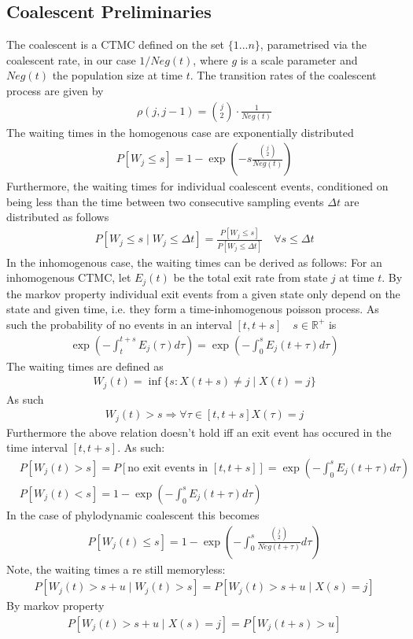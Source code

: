 \documentclass{article}
\newcommand{\R}{\mathbb{R}}
\theoremstyle{definition}
\begin{document}
\subsection{Coalescent Preliminaries}
The coalescent is a CTMC defined on the set $\{1 ... n\}$, parametrised via the coalescent rate, in our case $1/Neg(t)$, where $g$ is a scale parameter and $Neg(t)$ the population size at time $t$. 
The transition rates of the coalescent process are given by 
\begin{gather*}
\rho(j, j-1) = \binom{j}{2}\cdot\frac{1}{Neg(t)}
\end{gather*}
The waiting times in the homogenous case are exponentially distributed
\begin{gather*}
P[W_j \leq s] = 1-\exp(-s\frac{\binom{j}{2}}{Neg(t)})
\end{gather*}
Furthermore, the waiting times for individual coalescent events, conditioned on being less than the time between two consecutive sampling events $\Delta t$ are distributed as follows
\begin{gather}\label{eq:conditional}
P[W_j \leq s\mid W_j \leq \Delta t ] = \frac{P[W_j \leq s]}{P[W_j \leq \Delta t]} \quad\forall s \leq \Delta t
\end{gather}
In the inhomogenous case, the waiting times can be derived as follows:
For an inhomogenous CTMC, let $E_j(t)$ be the total exit rate from state $j$ at time $t$.
By the markov property individual exit events from a given state only depend on the state and given time, i.e. they form a time-inhomogenous poisson process.
As such the probability of no events in an interval $[t,t+s]\quad s\in \R^+$ is 
\begin{gather}
\exp(-\int_t^{t+s}E_j(\tau)d\tau) = \exp(-\int_0^{s}E_j(t+\tau)d\tau)
\end{gather}
The waiting times are defined as
\begin{gather}
W_j(t) = \inf\{s:X(t+s)\neq j \mid X(t) = j\}
\end{gather}
As such
\begin{gather}
W_j(t) > s \Rightarrow \forall \tau\in[t, t+s] X(\tau) = j
\end{gather}
Furthermore the above relation doesn't hold iff an exit event has occured in the time interval $[t,t+s]$. As such:
\begin{align*}
&P[W_j(t) > s] = P[\text{no exit events in }[t,t+s]] = \exp(-\int_0^{s}E_j(t+\tau)d\tau)\\
&P[W_j(t) < s] = 1 - \exp(-\int_0^{s}E_j(t+\tau)d\tau)
\end{align*}
In the case of phylodynamic coalescent this becomes
\begin{gather}
P[W_j(t) \leq s] = 1 - \exp(-\int_0^{s}\frac{\binom{j}{2}}{Neg(t+\tau)}d\tau)
\end{gather}
\newpage
Note, the waiting times a
re still memoryless:
\begin{gather}
P\left[W_j(t) > s+u\mid W_j(t)>s \right] = P\left[W_j(t) > s+u\mid X(s)=j\right]
\end{gather}
By markov property
\begin{gather}
P\left[W_j(t) > s+u\mid X(s)=j\right] = P\left[W_j(t+s) > u\right]
\end{gather}
\end{document}
